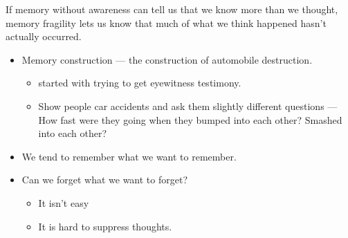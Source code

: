 \documentclass[12pt]{article}
\begin{document}
If memory without awareness can tell us that we know more than we thought,
memory fragility lets us know that much of what we think happened hasn't
actually occurred.

\begin{itemize}
	\item Memory construction --- the construction of automobile destruction.
		\begin{itemize}
			\item started with trying to get eyewitness testimony.
			\item Show people car accidents and ask them slightly different
				questions --- How fast were they going when they bumped into
				each other? Smashed into each other?
		\end{itemize}
	\item We tend to remember what we want to remember.
	\item Can we forget what we want to forget?
		\begin{itemize}
			\item It isn't easy
			\item It is hard to suppress thoughts.
		\end{itemize}
\end{itemize}
\end{document}
